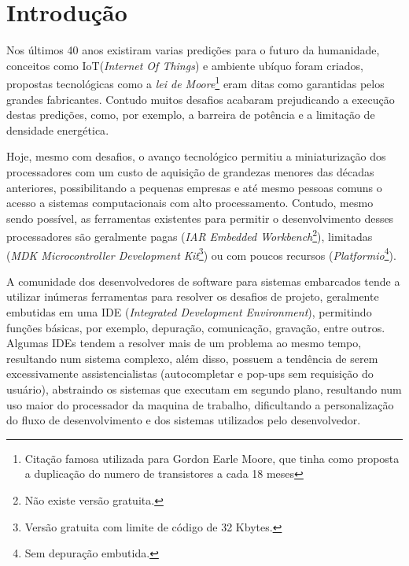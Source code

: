 \chapter{Introdução}
Nos últimos 40 anos existiram varias predições para o futuro da humanidade, conceitos como IoT(\textit{Internet Of Things})\cite{gates1995estrada} e ambiente ubíquo\cite{weiser1991computer} foram criados, propostas tecnológicas como a \textit{lei de Moore}\footnote{Citação famosa utilizada para Gordon Earle Moore, que tinha como proposta a duplicação do numero de transistores a cada 18 meses} eram ditas como garantidas pelos grandes fabricantes. Contudo muitos desafios acabaram prejudicando a execução destas predições, como, por exemplo, a barreira de potência\cite{Patterson:2008:COD:1502247} e a limitação de densidade energética\cite{paradiso2005energy}.

Hoje, mesmo com desafios, o avanço tecnológico permitiu a miniaturização dos processadores com um custo de aquisição de grandezas menores das décadas anteriores\cite{nordhaus2007two}, possibilitando a pequenas empresas e até mesmo pessoas comuns o acesso a sistemas computacionais com alto processamento. Contudo, mesmo	 sendo possível, as ferramentas existentes para permitir o desenvolvimento desses processadores são geralmente pagas (\textit{IAR Embedded Workbench}\footnote{Não existe versão gratuita.}), limitadas (\textit{MDK Microcontroller Development Kit}\footnote{Versão gratuita com limite de código de 32 Kbytes.}) ou com poucos recursos (\textit{Platformio}\footnote{Sem depuração embutida.}).

A comunidade dos desenvolvedores de software para sistemas embarcados tende a utilizar inúmeras ferramentas para resolver os desafios de projeto, geralmente embutidas em uma IDE (\textit{Integrated Development Environment}), permitindo funções básicas, por exemplo, depuração, comunicação, gravação, entre outros. Algumas IDEs tendem a resolver mais de um problema ao mesmo tempo, resultando num sistema complexo, além disso, possuem a tendência de serem excessivamente assistencialistas (autocompletar e pop-ups sem requisição do usuário), abstraindo os sistemas que executam em segundo plano, resultando num uso maior do processador da maquina de trabalho, dificultando a personalização do fluxo de desenvolvimento e dos sistemas utilizados pelo desenvolvedor.

\iffalse
O intuito deste trabalho é a realização de um sistema para possibilitar aos desenvolvedores a programação de sistemas embarcados, sem a necessidade de utilizar sistemas assistencialistas que possam limitar a evolução do trabalho ou a utilização do produto final concebido.
\fi

